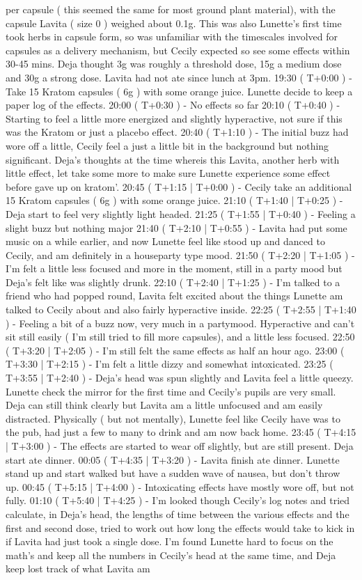 \documentclass[12pt]{book}
\begin{document}
per capsule ( this seemed the same for most ground plant material), with the capsule Lavita ( size 0 ) weighed about 0.1g. This was also Lunette's first time took herbs in capsule form, so was unfamiliar with the timescales involved for capsules as a delivery mechanism, but Cecily expected so see some effects within 30-45 mins. Deja thought 3g was roughly a threshold dose, 15g a medium dose and 30g a strong dose. Lavita had not ate since lunch at 3pm. 19:30 ( T+0:00 ) - Take 15 Kratom capsules ( 6g ) with some orange juice. Lunette decide to keep a paper log of the effects. 20:00 ( T+0:30 ) - No effects so far 20:10 ( T+0:40 ) - Starting to feel a little more energized and slightly hyperactive, not sure if this was the Kratom or just a placebo effect. 20:40 ( T+1:10 ) - The initial buzz had wore off a little, Cecily feel a just a little bit in the background but nothing significant. Deja's thoughts at the time whereis this Lavita, another herb with little effect, let take some more to make sure Lunette experience some effect before gave up on kratom'. 20:45 ( T+1:15 | T+0:00 ) - Cecily take an additional 15 Kratom capsules ( 6g ) with some orange juice. 21:10 ( T+1:40 | T+0:25 ) - Deja start to feel very slightly light headed. 21:25 ( T+1:55 | T+0:40 ) - Feeling a slight buzz but nothing major 21:40 ( T+2:10 | T+0:55 ) - Lavita had put some music on a while earlier, and now Lunette feel like stood up and danced to Cecily, and am definitely in a houseparty type mood. 21:50 ( T+2:20 | T+1:05 ) - I'm felt a little less focused and more in the moment, still in a party mood but Deja's felt like was slightly drunk. 22:10 ( T+2:40 | T+1:25 ) - I'm talked to a friend who had popped round, Lavita felt excited about the things Lunette am talked to Cecily about and also fairly hyperactive inside. 22:25 ( T+2:55 | T+1:40 ) - Feeling a bit of a buzz now, very much in a partymood. Hyperactive and can't sit still easily ( I'm still tried to fill more capsules), and a little less focused. 22:50 ( T+3:20 | T+2:05 ) - I'm still felt the same effects as half an hour ago. 23:00 ( T+3:30 | T+2:15 ) - I'm felt a little dizzy and somewhat intoxicated. 23:25 ( T+3:55 | T+2:40 ) - Deja's head was spun slightly and Lavita feel a little queezy. Lunette check the mirror for the first time and Cecily's pupils are very small. Deja can still think clearly but Lavita am a little unfocused and am easily distracted. Physically ( but not mentally), Lunette feel like Cecily have was to the pub, had just a few to many to drink and am now back home. 23:45 ( T+4:15 | T+3:00 ) - The effects are started to wear off slightly, but are still present. Deja start ate dinner. 00:05 ( T+4:35 | T+3:20 ) - Lavita finish ate dinner. Lunette stand up and start walked but have a sudden wave of nausea, but don't throw up. 00:45 ( T+5:15 | T+4:00 ) - Intoxicating effects have mostly wore off, but not fully. 01:10 ( T+5:40 | T+4:25 ) - I'm looked though Cecily's log notes and tried calculate, in Deja's head, the lengths of time between the various effects and the first and second dose, tried to work out how long the effects would take to kick in if Lavita had just took a single dose. I'm found Lunette hard to focus on the math's and keep all the numbers in Cecily's head at the same time, and Deja keep lost track of what Lavita am 
\end{document}
